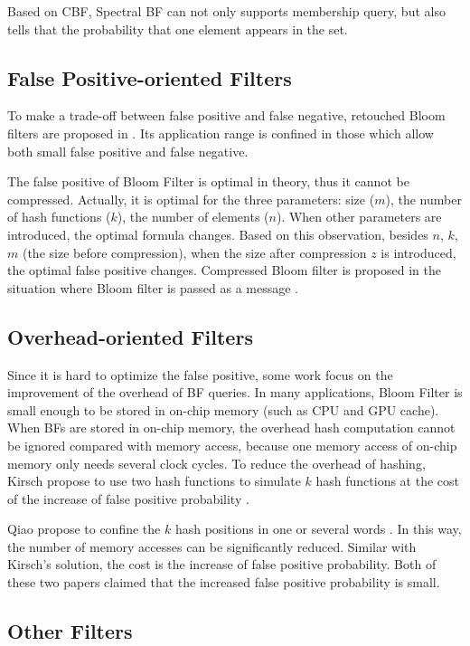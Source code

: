 Based on CBF, Spectral BF \cite{spectralBF} can not only supports membership query, but also tells that the probability that one element appears in the set.

\subsection{False Positive-oriented Filters}
To make a trade-off between false positive and false negative, retouched Bloom filters are proposed in \cite{retouchedBF}. Its application range is confined in those which allow both small false positive and false negative. 

The false positive of Bloom Filter is optimal in theory, thus it cannot be compressed. Actually, it is optimal for the three parameters: size ($m$), the number of hash functions ($k$), the number of elements ($n$). When other parameters are introduced, the optimal formula changes. 
Based on this observation, besides $n$, $k$, $m$ (the size before compression), when the size after compression $z$ is introduced, the optimal false positive changes. Compressed Bloom filter is proposed in the situation where Bloom filter is passed as a message \cite{compressedBF}. 

\subsection{Overhead-oriented Filters}
Since it is hard to optimize the false positive, some work focus on the improvement of the overhead of BF queries. 
In many applications, Bloom Filter is small enough to be stored in on-chip memory (such as CPU and GPU cache). When BFs are stored in on-chip memory, the overhead hash computation cannot be ignored compared with memory access, because one memory access of on-chip memory only needs several clock cycles. To reduce the overhead of hashing, Kirsch \etal propose to use two hash functions to simulate $k$ hash functions at the cost of the increase of false positive probability \cite{lessHashBF}.


Qiao \etal propose to confine the $k$ hash positions in one or several words \cite{onemem}. In this way, the number of memory accesses can be significantly reduced. Similar with Kirsch's solution, the cost is the increase of false positive probability. Both of these two papers claimed that the increased false positive probability is small.

\subsection{Other Filters}

